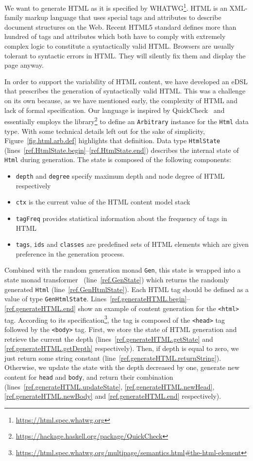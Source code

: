 \documentclass[sigconf]{acmart}
\begin{document}
We want to generate HTML as it is specified by WHATWG\footnote{\url{https://html.spec.whatwg.org}}. HTML is an XML-family markup language that uses special tags and attributes to describe document structures on the Web. Recent HTML5 standard defines more than hundred of tags and attributes which both have to comply with extremely complex logic to constitute a syntactically valid HTML. Browsers are usually tolerant to syntactic errors in HTML. They will silently fix them and display the page anyway.

In order to support the variability of HTML content, we have developed an eDSL that prescribes the generation of syntactically valid HTML. This was a challenge on its own because, as we have mentioned early, the complexity of HTML and lack of formal specification. Our language is inspired by QuickCheck~\cite{claessen2011quickcheck} and essentially employs the library\footnote{\url{https://hackage.haskell.org/package/QuickCheck}} to define an \texttt{Arbitrary} instance for the \texttt{Html} data type. With some technical details left out for the sake of simplicity, Figure~\ref{fig.html.arb.def} highlights that definition. Data type \texttt{HtmlState} (lines~\ref{ref.HtmlState.begin}--\ref{ref.HtmlState.end}) describes the internal state of \texttt{Html} during generation. The state is composed of the following components:
\begin{itemize}
\item \texttt{depth} and \texttt{degree} specify maximum depth and node degree of HTML respectively
\item \texttt{ctx} is the current value of the HTML content model stack 
\item \texttt{tagFreq} provides statistical information about the frequency of tags in HTML
\item \texttt{tags}, \texttt{ids} and \texttt{classes} are predefined sets of HTML elements which are given preference in the generation process.  
\end{itemize}
Combined with the random generation monad \texttt{Gen}, this state is wrapped into a state monad transformer~\cite{jones1995functional} (line~\ref{ref.GenState}) which returns the randomly generated \texttt{Html} (line~\ref{ref.GenHtmlState}). Each HTML tag should be defined as a value of type \texttt{GenHtmlState}. Lines~\ref{ref.generateHTML.begin}--\ref{ref.generateHTML.end} show an example of content generation for the \texttt{<html>} tag. According to its specification\footnote{\url{https://html.spec.whatwg.org/multipage/semantics.html\#the-html-element}}, the tag is composed of the \texttt{<head>} tag followed by the \texttt{<body>} tag. First, we store the state of HTML generation and retrieve the current the depth (lines~\ref{ref.generateHTML.getState} and \ref{ref.generateHTML.getDepth} respectively). Then, if depth is equal to zero, we just return some string constant (line~\ref{ref.generateHTML.returnString}). Otherwise, we update the state with the depth decreased by one, generate new content for \texttt{head} and \texttt{body}, and return their combination (lines~\ref{ref.generateHTML.updateState}, \ref{ref.generateHTML.newHead}, \ref{ref.generateHTML.newBody} and \ref{ref.generateHTML.end} respectively).
\end{document}
